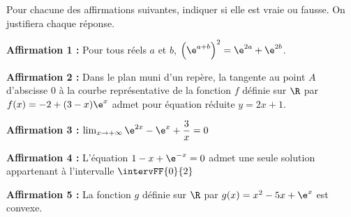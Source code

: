 Pour chacune des affirmations suivantes, indiquer si elle est vraie ou fausse. On justifiera chaque réponse.

\medskip

\textbf{Affirmation 1 :}  Pour tous réels $a$ et $b$, $\left(\e^{a+b}\right)^2 = \e^{2a} + \e^{2b}$.

\bigskip

\textbf{Affirmation 2 : } Dans le plan muni d’un repère, la tangente au point $A$ d’abscisse $0$ à la courbe représentative de la fonction $f$ définie sur $\R$ par $f(x)=-2+(3-x)\e^{x}$ admet pour équation réduite $y=2x+1$.

\bigskip

\textbf{Affirmation 3 : } $\lim_{x \to +\infty} \e^{2x} - \e^{x} + \dfrac{3}{x} = 0$

\bigskip

\textbf{Affirmation 4 : } L’équation $1 - x + \e^{-x} = 0$ admet une seule solution appartenant à l’intervalle $\intervFF{0}{2}$

\bigskip

\textbf{Affirmation 5 : } La fonction $g$ définie sur $\R$ par $g(x)=x^2-5x+\e^x$ est convexe.

